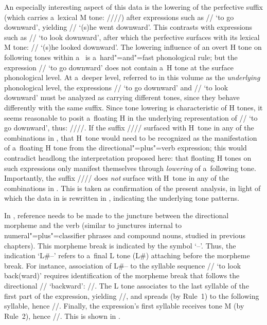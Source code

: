 An especially interesting aspect of this data is the lowering of the {perfective} suffix (which carries a~lexical M tone: /\mbox{//}/) after expressions such as // ‘to go downward’, yielding // ‘(s)he went downward’. This contrasts with expressions such as // ‘to look downward’, after which the {perfective} surfaces with its lexical M tone: // ‘(s)he looked downward’. The lowering influence of an overt H tone on following tones within a~ is a~hard"=and"=fast {phonological rule}; but the expression // ‘to go downward’ does not contain a~H tone at the surface phonological level. At a~deeper level, referred to in this volume as the \textit{underlying} phonological level, the expressions // ‘to go downward’ and // ‘to look downward’ must be analyzed as carrying different tones, since they behave differently with the same suffix. Since tone lowering is characteristic of H tones, it seems reasonable to posit a~floating H in the underlying representation of // ‘to go downward’, thus: ////. If the suffix /\mbox{//}/ surfaced with H~tone in any of the combinations in , that H~tone would need to be recognized as the manifestation of a~floating H tone from the directional"=plus"=verb expression; this would contradict headlong the interpretation proposed here: that floating H tones on such expressions only manifest themselves through \textit{lowering} of a~following tone. Importantly, the suffix /\mbox{//}/ does \textit{not} surface with H~tone in any of the combinations in . This is taken as confirmation of the present analysis, in light of which the data in  is rewritten in , indicating the underlying tone patterns. 

In , reference needs to be made to the juncture between the directional morpheme and the verb (similar to junctures internal to numeral"=plus"=classifier phrases and compound nouns, studied in previous chapters). This morpheme break is indicated by the symbol ‘--’. Thus, the indication ‘L\#--’ refers to a~final L tone (L\#) attaching before the morpheme break. For instance, association of L\#-- to the syllable sequence // ‘to look back(ward)’ requires identification of the morpheme break that follows the directional // ‘backward’: //. The L tone associates to the last syllable of the first part of the expression, yielding //, and spreads (by Rule~1) to the following syllable, hence //. Finally, the expression's first syllable receives tone M (by Rule~2), hence //. This is shown in .

